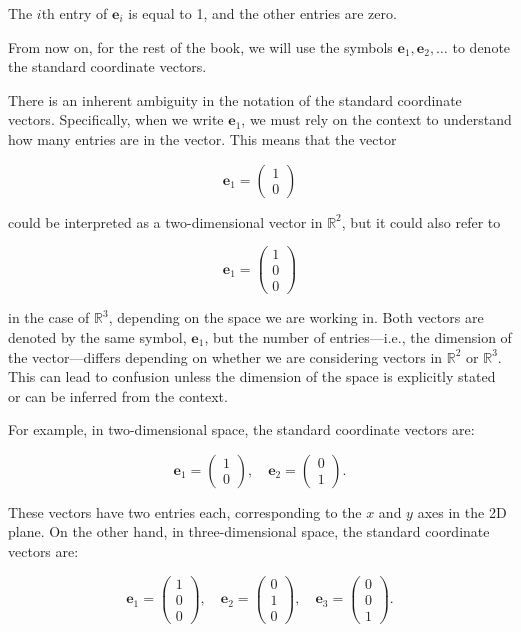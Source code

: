 \documentclass[a4paper,12pt]{article}
\begin{document}
The $i$th entry of $\mathbf{e}_i$ is equal to 1, and the other entries are zero.

From now on, for the rest of the book, we will use the symbols $\mathbf{e}_1, \mathbf{e}_2, \dots$ to denote the standard coordinate vectors.

There is an inherent ambiguity in the notation of the standard coordinate vectors. Specifically, when we write $\mathbf{e}_1$, we must rely on the context to understand how many entries are in the vector. This means that the vector

\[
\mathbf{e}_1 = \begin{pmatrix} 1 \\ 0 \end{pmatrix}
\]

could be interpreted as a two-dimensional vector in $\mathbb{R}^2$, but it could also refer to

\[
\mathbf{e}_1 = \begin{pmatrix} 1 \\ 0 \\ 0 \end{pmatrix}
\]

in the case of $\mathbb{R}^3$, depending on the space we are working in. Both vectors are denoted by the same symbol, $\mathbf{e}_1$, but the number of entries—i.e., the dimension of the vector—differs depending on whether we are considering vectors in $\mathbb{R}^2$ or $\mathbb{R}^3$. This can lead to confusion unless the dimension of the space is explicitly stated or can be inferred from the context.

For example, in two-dimensional space, the standard coordinate vectors are:

\[
\mathbf{e}_1 = \begin{pmatrix} 1 \\ 0 \end{pmatrix}, \quad \mathbf{e}_2 = \begin{pmatrix} 0 \\ 1 \end{pmatrix}.
\]

These vectors have two entries each, corresponding to the $x$ and $y$ axes in the 2D plane. On the other hand, in three-dimensional space, the standard coordinate vectors are:

\[
\mathbf{e}_1 = \begin{pmatrix} 1 \\ 0 \\ 0 \end{pmatrix}, \quad \mathbf{e}_2 = \begin{pmatrix} 0 \\ 1 \\ 0 \end{pmatrix}, \quad \mathbf{e}_3 = \begin{pmatrix} 0 \\ 0 \\ 1 \end{pmatrix}.
\]
\end{document}
